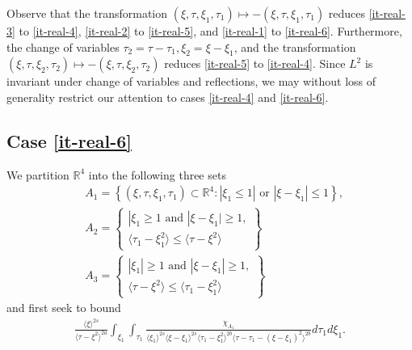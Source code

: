 \documentclass[12pt,reqno]{amsart}
\numberwithin{equation}{section}  %
\newcommand{\rr}{\mathbb{R}}
\begin{document}
%
%
Observe that the transformation $(\xi, \tau, \xi_{1}, \tau_{1}) \mapsto -(\xi, \tau,
\xi_{1}, \tau_{1})$ reduces \eqref{it-real-3} to \eqref{it-real-4}, \eqref{it-real-2} to
\eqref{it-real-5}, and \eqref{it-real-1} to \eqref{it-real-6}. Furthermore, the change of
variables $\tau_{2} = \tau - \tau_{1}, \xi_{2} = \xi - \xi_{1}$, and the
transformation $(\xi, \tau, \xi_{2}, \tau_{2}) \mapsto - (\xi, \tau, \xi_{2},
\tau_{2})$ reduces \eqref{it-real-5} to \eqref{it-real-4}. Since $L^{2}$ is invariant
under change of variables and reflections, we may without loss of generality
restrict our attention to cases \eqref{it-real-4} and \eqref{it-real-6}.
 \subsection{Case \eqref{it-real-6}} 
\label{ssec:case-it-real-6}
We partition $\rr^{4}$ into the following three sets 
%
%
\begin{equation*}
\begin{split}
  & A_{1} = \left\{ (\xi, \tau, \xi_{1}, \tau_{1}) \subset \rr^{4}: |
  \xi_{1} \le 1 | \text{ or } | \xi - \xi_{1} | \le 1 \right\},
  \\
  & A_{2} = 
  \begin{Bmatrix}
    | \xi_{1} \ge 1 \text{ and } | \xi - \xi_{1} | \ge 1,
    \\
    \langle \tau_{1} - \xi_{1}^{2} \rangle  \le \langle \tau -
  \xi^{2} \rangle
\end{Bmatrix}
  \\
  & A_{3} = 
  \begin{Bmatrix}
    | \xi_{1} | \ge 1 \text{ and } | \xi - \xi_{1} | \ge 1,
    \\
    \langle \tau - \xi^{2} \rangle  \le \langle \tau_{1} - \xi_{1}^{2} \rangle 
  \end{Bmatrix}
\end{split}
\end{equation*}
%
%
%
%
%
and first seek to bound
%
%
\begin{equation}
  \label{case-1-region-1}
  \begin{split}
    \frac{ \langle \xi
    \rangle ^{2s}}{\langle \tau - \xi^{2} \rangle ^{2a}}
    \int_{\xi_{1}} \int_{\tau_{1}} \frac{\chi_{A_{1}}}{ \langle \xi_{1} \rangle ^{2s} \langle \xi-\xi_{1} \rangle ^{2s} 
    \langle \tau_{1} - \xi_{1}^{2} \rangle^{2b} \langle  \tau - \tau_{1} -
    (\xi - \xi_{1})^{2} \rangle^{2b} }
    d \tau_1 d \xi_{1}.
  \end{split}
\end{equation}
\end{document}
